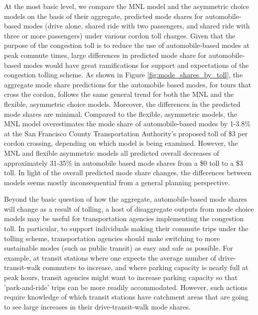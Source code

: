 At the most basic level, we compare the MNL model and the asymmetric choice models on the basis of their aggregate, predicted mode shares for automobile-based modes (drive alone, shared ride with two passengers, and shared ride with three or more passengers) under various cordon toll charges. Given that the purpose of the congestion toll is to reduce the use of automobile-based modes at peak commute times, large differences in predicted mode share for automobile-based modes would have great ramifications for support and expectations of the congestion tolling scheme. As shown in Figure \ref{fig:mode_shares_by_toll}, the aggregate mode share predictions for the automobile based modes, for tours that cross the cordon, follows the same general trend for both the MNL and the flexible, asymmetric choice models. Moreover, the differences in the predicted mode shares are minimal. Compared to the flexible, asymmetric models, the MNL model overestimates the mode share of automobile-based modes by 1-3.8\% at the San Francisco County Transportation Authority's proposed toll of \$3 per cordon crossing, depending on which model is being examined. However, the MNL and flexible asymmetric models all predicted overall decreases of approximately 31-35\% in automobile based mode shares from a \$0 toll to a \$3 toll. In light of the overall predicted mode share changes, the differences between models seems mostly inconsequential from a general planning perspective.

Beyond the basic question of how the aggregate, automobile-based mode shares will change as a result of tolling, a host of disaggregate outputs from mode choice models may be useful for transportation agencies implementing the congestion toll. In particular, to support individuals making their commute trips under the tolling scheme, transportation agencies should make switching to more sustainable modes (such as public transit) as easy and safe as possible. For example, at transit stations where one expects the average number of drive-transit-walk commuters to increase, and where parking capacity is nearly full at peak hours, transit agencies might want to increase parking capacity so that 'park-and-ride' trips can be more readily accommodated. However, such actions require knowledge of which transit stations have catchment areas that are going to see large increases in their drive-transit-walk mode shares. 

